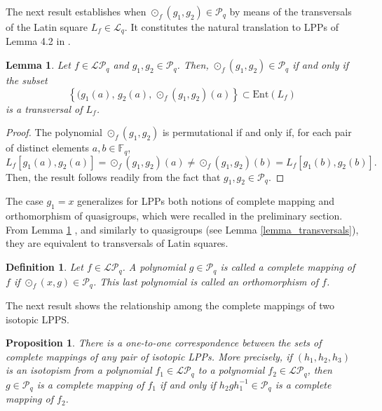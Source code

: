\documentclass[pdflatex,sn-mathphys-num]{sn-jnl}
\theoremstyle{thmstyleone}%
\newtheorem{proposition}{Proposition}[section]
\newtheorem{lemma}{Lemma}[section]
\newtheorem{definition}{Definition}[section]
\begin{document}
\vspace{0.2cm}

The next result establishes when $\odot_f(g_1,g_2)\in\mathcal{P}_q$ by means of the transversals of the Latin square $L_f\in\mathcal{L}_q$. It constitutes the natural translation to LPPs of Lemma 4.2 in \cite{Falcon2025}. 

\begin{lemma}\label{lemma_hqp} Let $f\in\mathcal{LP}_q$ and $g_1,g_2\in\mathcal{P}_q$. Then, $\odot_f(g_1,g_2)\in\mathcal{P}_q$ if and only if the subset
\[\left\{(g_1(a),\,g_2(a),\,\odot_f(g_1,g_2)(a)\right\}\subset \mathrm{Ent}(L_f)\]
is a transversal of $L_f$.
\end{lemma}

\begin{proof} The polynomial $\odot_f(g_1,g_2)$ is permutational if and only if, for each pair of distinct elements $a,b\in\mathbb{F}_q$, 
\[L_f[g_1(a),g_2(a)]=\odot_f(g_1,g_2)(a)\neq \odot_f(g_1,g_2)(b)=L_f[g_1(b),g_2(b)].\]
Then, the result follows readily from the fact that $g_1,g_2\in \mathcal{P}_q$.    
\end{proof}

\vspace{0.2cm}

The case $g_1=x$ generalizes for LPPs both notions of complete mapping and orthomorphism of quasigroups, which were recalled in the preliminary section. From Lemma \ref{lemma_hqp} , and similarly to quasigroups (see Lemma \ref{lemma_transversals}), they are equivalent to transversals of Latin squares. 

\begin{definition}\label{definition_orthomorphism} Let $f\in\mathcal{LP}_q$. A polynomial $g\in\mathcal{P}_q$ is called a {\em complete mapping} of $f$ if $\odot_f(x,g)\in \mathcal{P}_q$. This last polynomial is called an {\em orthomorphism} of $f$.
\end{definition}

\vspace{0.2cm}

The next result shows the relationship among the complete mappings of two isotopic LPPS.

\begin{proposition} \label{proposition_transversal_isotopic} There is a one-to-one correspondence between the sets of complete mappings of any pair of isotopic LPPs. More precisely, if $(h_1,h_2,h_3)$ is an isotopism from a polynomial $f_1\in\mathcal{LP}_q$ to a polynomial $f_2\in\mathcal{LP}_q$, then $g\in\mathcal{P}_q$ is a complete mapping of $f_1$ if and only if $h_2gh_1^{-1}\in\mathcal{P}_q$ is a complete mapping of $f_2$.
\end{proposition}
\end{document}
